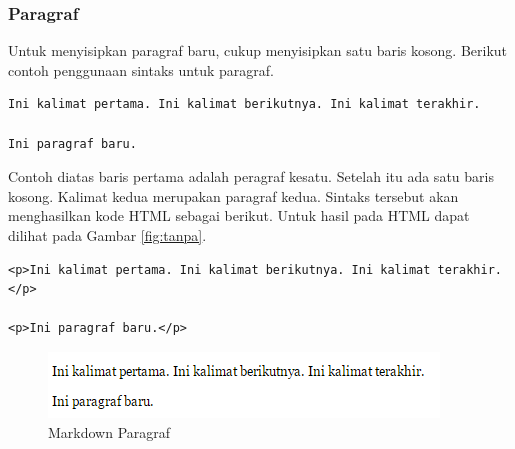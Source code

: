 \subsubsection{Paragraf}
Untuk menyisipkan paragraf baru, cukup menyisipkan satu baris kosong. Berikut
contoh penggunaan sintaks untuk paragraf.
\begin{lstlisting}
Ini kalimat pertama. Ini kalimat berikutnya. Ini kalimat terakhir.

Ini paragraf baru.
\end{lstlisting}
Contoh diatas baris pertama adalah peragraf kesatu. Setelah itu ada satu baris
kosong. Kalimat kedua merupakan paragraf kedua. Sintaks tersebut akan
menghasilkan kode HTML sebagai berikut. Untuk hasil pada HTML dapat dilihat pada
Gambar \ref{fig:tanpa}.
\begin{lstlisting}
<p>Ini kalimat pertama. Ini kalimat berikutnya. Ini kalimat terakhir.</p>

<p>Ini paragraf baru.</p>
\end{lstlisting}
\begin{figure}[H]
\centering
\includegraphics[scale=1]{Gambar/para.png}
\caption[Markdown Paragraf]{Markdown Paragraf}
\label{fig:para}
\end{figure}

